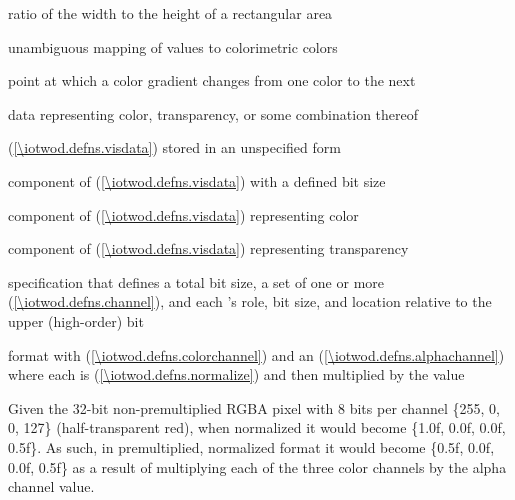 %
ratio of the width to the height of a rectangular area

%
unambiguous mapping of values to colorimetric colors

%
point at which a color gradient changes from one color to the next

%
data representing color, transparency, or some combination thereof

%
  (\ref{\iotwod.defns.visdata}) stored in an unspecified form

%
component of  (\ref{\iotwod.defns.visdata}) with a defined bit size

%
component of  (\ref{\iotwod.defns.visdata}) representing color

%
component of  (\ref{\iotwod.defns.visdata}) representing transparency

%
specification that defines a total bit size, a set of one or more  (\ref{\iotwod.defns.channel}), and each 's role, bit size, and location relative to the upper (high-order) bit

%
format with  (\ref{\iotwod.defns.colorchannel}) and an  (\ref{\iotwod.defns.alphachannel}) where each  is  (\ref{\iotwod.defns.normalize}) and then multiplied by the   value
\begin{example}
Given the 32-bit non-premultiplied RGBA pixel with 8 bits per channel \{255, 0, 0, 127\} (half-transparent red), when normalized it would become \{1.0f, 0.0f, 0.0f, 0.5f\}. As such, in premultiplied, normalized format it would become \{0.5f, 0.0f, 0.0f, 0.5f\} as a result of multiplying each of the three color channels by the alpha channel value.
\end{example}

